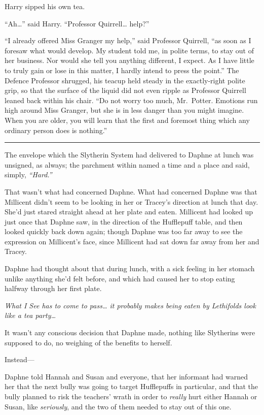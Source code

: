 Harry sipped his own tea.

``Ah\ldots{}'' said Harry. ``Professor Quirrell\ldots{} help?''

``I already offered Miss Granger my help,'' said Professor Quirrell,
``as soon as I foresaw what would develop. My student told me, in polite
terms, to stay out of her business. Nor would she tell you anything
different, I expect. As I have little to truly gain or lose in this
matter, I hardly intend to press the point.'' The Defence Professor
shrugged, his teacup held steady in the exactly-right polite grip, so
that the surface of the liquid did not even ripple as Professor Quirrell
leaned back within his chair. ``Do not worry too much, Mr.~Potter.
Emotions run high around Miss Granger, but she is in less danger than
you might imagine. When you are older, you will learn that the first and
foremost thing which any ordinary person does is nothing.''

\begin{center}\rule{3in}{0.4pt}\end{center}

The envelope which the Slytherin System had delivered to Daphne at lunch
was unsigned, as always; the parchment within named a time and a place
and said, simply, \emph{``Hard.''}

That wasn't what had concerned Daphne. What had concerned Daphne was
that Millicent didn't seem to be looking in her or Tracey's direction at
lunch that day. She'd just stared straight ahead at her plate and eaten.
Millicent had looked up just once that Daphne saw, in the direction of
the Hufflepuff table, and then looked quickly back down again; though
Daphne was too far away to see the expression on Millicent's face, since
Millicent had sat down far away from her and Tracey.

Daphne had thought about that during lunch, with a sick feeling in her
stomach unlike anything she'd felt before, and which had caused her to
stop eating halfway through her first plate.

\emph{What I See has to come to pass\ldots{} it probably makes being
eaten by Lethifolds look like a tea party\ldots{}}

It wasn't any conscious decision that Daphne made, nothing like
Slytherins were supposed to do, no weighing of the benefits to herself.

Instead---

Daphne told Hannah and Susan and everyone, that her informant had warned
her that the next bully was going to target Hufflepuffs in particular,
and that the bully planned to risk the teachers' wrath in order to
\emph{really} hurt either Hannah or Susan, like \emph{seriously}, and
the two of them needed to stay out of this one.

